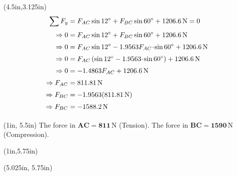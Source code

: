 \documentclass[10pt,oneside]{article}
\begin{document}
\begin{textblock*}{3.5in}(4.5in,3.125in)
	\begin{align*}
		\sum F_y &= F_{AC}\sin 12^\circ + F_{BC}\sin 60^\circ + 1206.6\,\text{N}= 0 \\[0.25em]
		\Rightarrow 0 &= F_{AC}\sin 12^\circ + F_{BC}\sin 60^\circ + 1206.6\,\text{N} \\[0.25em]		
		\Rightarrow 0 &= F_{AC}\sin 12^\circ -1.9563F_{AC}\!\cdot\!\sin 60^\circ + 1206.6\,\text{N} \\[0.25em]		
		\Rightarrow 0 &= F_{AC}\left(\sin 12^\circ -1.9563\!\cdot\!\sin 60^\circ\right) + 1206.6\,\text{N} \\[0.25em]		
		\Rightarrow 0 &= -1.4863F_{AC} + 1206.6\,\text{N} \\[0.25em]		
		\Rightarrow F_{AC} &= 811.81\,\text{N} \\[0.25em]		
		\Rightarrow F_{BC} &= -1.9563(811.81\,\text{N})  \\[0.25em]		
		\Rightarrow F_{BC} &= -1588.2\,\text{N}  \\[0.25em]		
	\end{align*}
\end{textblock*}

\begin{textblock*}{6.75in}(1in, 5.5in)
	\centering
	The force in $\bm{AC=811}\,$N (Tension). The force in $\bm{BC=1590}\,$N (Compression).
\end{textblock*}

\begin{textblock*}{3.5in}(1in,5.75in)
\end{textblock*}
\begin{textblock*}{2.75in}(5.025in, 5.75in)
	\cbox{
		\centering
				
	}
\end{textblock*}
\end{document}
